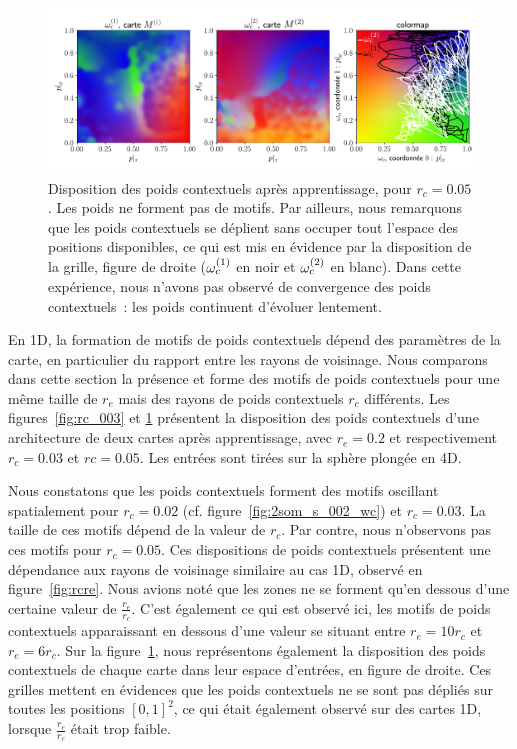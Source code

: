 \documentclass[../main]{subfiles}
\begin{document}
\begin{figure}
	\includegraphics[width=\textwidth]{wc_rc005_grid.pdf}
	\caption{Disposition des poids contextuels après apprentissage, pour $r_c =0.05$. Les poids ne forment pas de motifs. Par ailleurs, nous remarquons que les poids contextuels se déplient sans occuper tout l'espace des positions disponibles, ce qui est mis en évidence par la disposition de la grille, figure de droite ($\omega_c^{({1})}$ en noir et $\omega_c^{({2})}$ en blanc).
	Dans cette expérience, nous n'avons pas observé de convergence des poids contextuels~: les poids continuent d'évoluer lentement.
	\label{fig:rc_005}}
\end{figure}

En 1D, la formation de motifs de poids contextuels dépend des paramètres de la carte, en particulier du rapport entre les rayons de voisinage.
Nous comparons dans cette section la présence et forme des motifs de poids contextuels pour une même taille de $r_e$ mais des rayons de poids contextuels $r_c$ différents.
Les figures~\ref{fig:rc_003} et \ref{fig:rc_005} présentent la disposition des poids contextuels d'une architecture de deux cartes après apprentissage, avec $r_e = 0.2$ et respectivement $r_c = 0.03$ et $rc = 0.05$. Les entrées sont tirées sur la sphère plongée en 4D.


Nous constatons que les poids contextuels forment des motifs oscillant spatialement pour $r_c = 0.02$ (cf. figure~\ref{fig:2som_s_002_wc}) et $r_c = 0.03$. La taille de ces motifs dépend de la valeur de $r_c$. Par contre, nous n'observons pas ces motifs pour $r_c = 0.05$.
Ces dispositions de poids contextuels présentent une dépendance aux rayons de voisinage similaire au cas 1D, observé en figure~\ref{fig:rcre}.
Nous avions noté que les zones ne se forment qu'en dessous d'une certaine valeur de $\frac{r_e}{r_c}$. C'est également ce qui est observé ici, les motifs de poids contextuels apparaissant en dessous d'une valeur se situant entre $r_e = 10 r_c$ et $r_e = 6 r_c$.
Sur la figure~\ref{fig:rc_005}, nous représentons également la disposition des poids contextuels de chaque carte dans leur espace d'entrées, en figure de droite.
Ces grilles mettent en évidences que les poids contextuels ne se sont pas dépliés sur toutes les positions $[0,1]^2$, ce qui était également observé sur des cartes 1D, lorsque $\frac{r_e}{r_c}$ était trop faible.
\end{document}
